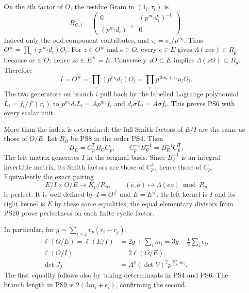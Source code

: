 \documentclass[11pt]{article}
\begin{document}
On the $i$th factor of $O$, the residue Gram in $(1_i,\tau_i)$ is
\[
 B_{O,i}=\begin{pmatrix}
 0&(p^{m_i}d_i)^{-1}\\(p^{m_i}d_i)^{-1}&0
 \end{pmatrix}.
 \tag{PS8}
\]
Indeed only the odd component contributes, and
$\tau_i=\sigma_i/p^{m_i}$. Thus
$O^\#=\prod_i(p^{m_i}d_i)O_i$.
For $z\in O^\#$ and $o\in O$, every $e\in E$ gives
$\Lambda(zoe)\in R_p$ because $oe\in O$; hence $zo\in E^\#=E$.
Conversely $zO\subset E$ implies $\Lambda(zO)\subset R_p$.
Therefore
\[
 I=O^\#=\prod_i(p^{m_i}d_i)O_i
       =\prod_i p^{\,3m_i+\epsilon_i}u_iO_i .
 \tag{PS9}
\]
The two generators on branch $i$ pull back by the labelled Lagrange
polynomial $L_i=f_i/f'(r_i)$ to
$p^{m_i}d_iL_i=Ap^{m_i}f_i$ and
$d_i\sigma L_i=A\sigma f_i$. This proves PS6 with every scalar unit.

More than the index is determined: the full Smith factors of $E/I$
are the same as those of $O/E$. Let $B_O$ be PS8 in the order PS4.
Then
\[
 B_E=C_p^{\mathsf T}B_OC_p,\qquad
 C_p^{-1}B_O^{-1}=B_E^{-1}C_p^{\mathsf T}.
 \tag{PS10}
\]
The left matrix generates $I$ in the original basis. Since $B_E^{-1}$
is an integral invertible matrix, its Smith factors are those of
$C_p^{\mathsf T}$, hence those of $C_p$.
Equivalently the exact pairing
\[
 E/I\times O/E\longrightarrow K_p/R_p,\qquad
 (\bar e,\bar o)\longmapsto\Lambda(eo)\bmod R_p
 \tag{PS11}
\]
is perfect. It is well defined by $I=O^\#$ and $E=E^\#$.
Its left kernel is $I$ and its right kernel is $E$ by these same
equalities; the equal elementary divisors from PS10 prove perfectness
on each finite cyclic factor.

In particular, for $g=\sum_{i<j}v_p(r_i-r_j)$,
\[
 \begin{aligned}
 \ell(O/E)=\ell(E/I)&=2g+\sum_i m_i
                   =3g-\tfrac12\sum_i\epsilon_i,\\
 \ell(O/I)&=2\ell(O/E),\\
 \det J_I&=A^8(\det V)^2p^{\sum_i m_i}.
 \end{aligned}\tag{PS12}
\]
The first equality follows also by taking determinants in PS4 and PS6.
The branch length in PS9 is $2(3m_i+\epsilon_i)$, confirming the second.
\end{document}

